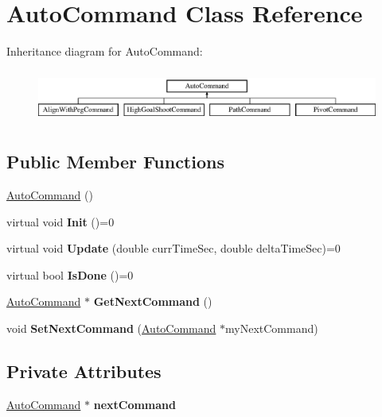 \hypertarget{class_auto_command}{}\section{Auto\+Command Class Reference}
\label{class_auto_command}
Inheritance diagram for Auto\+Command\+:\begin{figure}[H]
\begin{center}
\leavevmode
\includegraphics[height=1.761006cm]{class_auto_command}
\end{center}
\end{figure}
\subsection*{Public Member Functions}
\begin{DoxyCompactItemize}
\item 
\hyperlink{class_auto_command_aefc47d2d46e4ea8c74a11b0759f49d98}{Auto\+Command} ()
\item 
\mbox{\label{class_auto_command_a55e2d94651b71b68589629fb9e5b5e64}} 
virtual void {\bfseries Init} ()=0
\item 
\mbox{\label{class_auto_command_ae396d1857033236f2e1864ea0fff0f69}} 
virtual void {\bfseries Update} (double curr\+Time\+Sec, double delta\+Time\+Sec)=0
\item 
\mbox{\label{class_auto_command_af2a035dbde9903b13b6500f2801ad0be}} 
virtual bool {\bfseries Is\+Done} ()=0
\item 
\mbox{\label{class_auto_command_a13df47b2b27505a229670f1558491473}} 
\hyperlink{class_auto_command}{Auto\+Command} $\ast$ {\bfseries Get\+Next\+Command} ()
\item 
\mbox{\label{class_auto_command_a339b50cd26f092f84c27b06493f320f0}} 
void {\bfseries Set\+Next\+Command} (\hyperlink{class_auto_command}{Auto\+Command} $\ast$my\+Next\+Command)
\end{DoxyCompactItemize}
\subsection*{Private Attributes}
\begin{DoxyCompactItemize}
\item 
\mbox{\label{class_auto_command_a408872b0525fc1b6296d10727612c848}} 
\hyperlink{class_auto_command}{Auto\+Command} $\ast$ {\bfseries next\+Command}
\end{DoxyCompactItemize}


